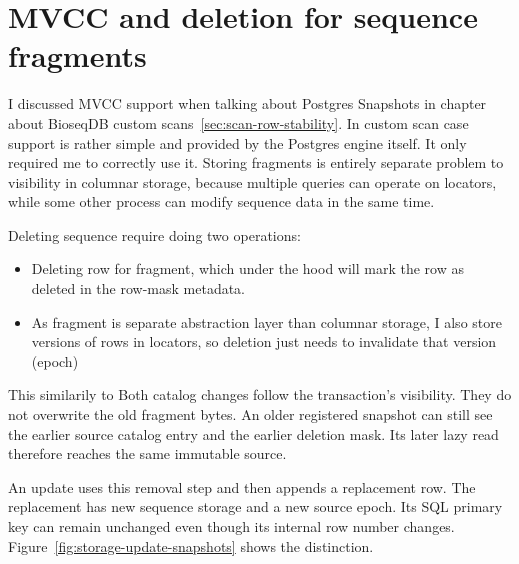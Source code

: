 \section{MVCC and deletion for sequence fragments}
\label{sec:pg-storage-versions}

I discussed MVCC support when talking about Postgres Snapshots in chapter about BioseqDB custom scans~\ref{sec:scan-row-stability}.
In custom scan case support is rather simple and provided by the Postgres engine itself. It only required me to correctly use it.
Storing fragments is entirely separate problem to visibility in columnar storage, because multiple queries can operate on locators, while some other process can 
modify sequence data in the same time. 

Deleting sequence require doing two operations:
\begin{itemize}
  \item Deleting row for fragment, which under the hood will mark the row as deleted in the row-mask metadata. 
  \item As fragment is separate abstraction layer than columnar storage, I also store versions of rows in locators, so deletion just needs to invalidate that version (epoch)
\end{itemize}

This similarily to 
Both catalog changes follow the transaction's visibility. They do not
overwrite the old fragment bytes. An older registered snapshot can still
see the earlier source catalog entry and the earlier deletion mask.
Its later lazy read therefore reaches the same immutable source.

An update uses this removal step and then appends a replacement row. The
replacement has new sequence storage and a new source epoch. Its SQL primary
key can remain unchanged even though its internal row number changes.
Figure~\ref{fig:storage-update-snapshots} shows the distinction.

